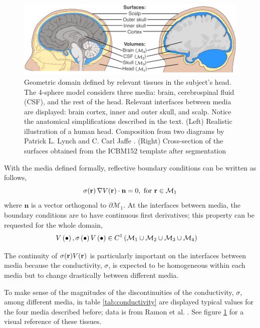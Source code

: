 \begin{figure}
\centering
\includegraphics[width=\linewidth]{./img/HeadSurfacesVolumes}
\caption{Geometric domain defined by relevant tissues in the subject's head. The 4-sphere model considers three media: brain, cerebrospinal fluid (CSF), and the rest of the head. Relevant interfaces between media are displayed: brain cortex, inner and outer skull, and scalp. Notice the anatomical simplifications described in the text. (Left) Realistic illustration of a human head. Composition from two diagrams by Patrick L. Lynch and C. Carl Jaffe \cite{wikipic1, wikipic2}.  (Right) Cross-section of the surfaces obtained from the ICBM152 template after segmentation}
\label{fig:diagrams2}
\end{figure}

With the media defined formally, reflective boundary conditions can be written as follows,
\begin{equation}
\sigma(\mathbf{r})\, \nabla V(\mathbf{r}) \cdot \mathbf{n} = 0, 
\text{ for } \mathbf{r} \in \mathcal{M}_1
\label{eq:boundary1}
\end{equation}
where $\mathbf{n}$ is a vector orthogonal to $\partial\mathcal{M}_1$.
%
At the interfaces between media, the boundary conditions are to have continuous first derivatives; this property can be requested for the whole domain,
\begin{align}
    V\left( \bullet \right), \sigma\left( \bullet \right) V\left( \bullet \right)  
    &\in C^1\left( \mathcal{M}_1 \cup \mathcal{M}_2 \cup \mathcal{M}_3 \cup \mathcal{M}_4  \right)
\end{align}

The continuity of $\sigma(\mathbf{r}) V(\mathbf{r})$ is particularly important on the interfaces between media because the conductivity, $\sigma$, is expected to be homogeneous within each media but to change drastically between different media. 

To make sense of the magnitudes of the discontinuities of the conductivity, $\sigma$, among different media, in table \ref{tab:conductivity} are displayed typical values for the four media described before; data is from Ramon et al. \cite{ramon2006influence}. See figure \ref{fig:diagrams2} for a visual reference of these tissues.

